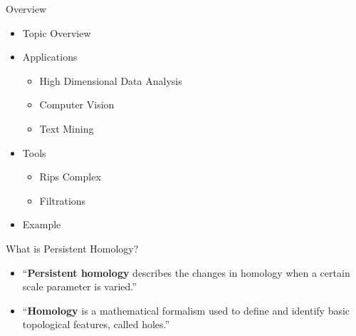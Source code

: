 






\begin{frame}
    \titlepage
\end{frame}

\begin{frame}{Overview}
	\begin{itemize}[<+->]
		\item Topic Overview
		\item Applications
			\begin{itemize}[<+->]
				\item High Dimensional Data Analysis
				\item Computer Vision
				\item Text Mining
			\end{itemize}
		\item Tools
			\begin{itemize}[<+->]
				\item Rips Complex
				\item Filtrations
			\end{itemize}
		\item Example
	\end{itemize}
\end{frame}

\begin{frame}{What is Persistent Homology?}
	\begin{itemize}[<+->]
		\item ``\textbf{Persistent homology} describes the changes in homology when a certain scale parameter is varied.'' \cite{wagner}
		\item ``\textbf{Homology} is a mathematical formalism used to deﬁne and identify basic topological features, called holes.'' \cite{wagner}
	\end{itemize}
	\begin{figure}[]
		\centering
		\caption{\cite{dey}}
	\end{figure}
\end{frame}

